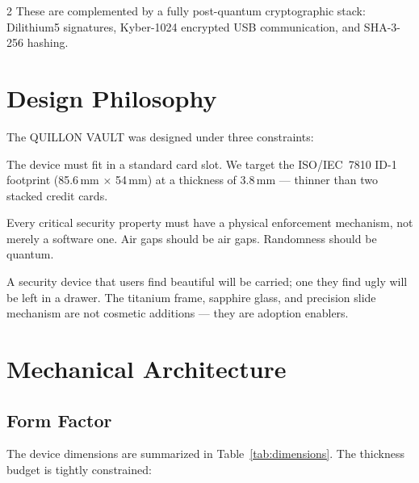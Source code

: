 \documentclass[11pt,a4paper]{article}
\begin{document}
\begin{multicols}{2}
These are complemented by a fully post-quantum cryptographic stack: Dilithium5
signatures, Kyber-1024 encrypted USB communication, and SHA-3-256 hashing.

\section{Design Philosophy}

The QUILLON VAULT was designed under three constraints:

\begin{description}[leftmargin=0.5em,itemsep=2pt]
  \item[Thinness.] The device must fit in a standard card slot. We target the
    ISO/IEC~7810 ID-1 footprint (85.6\,mm $\times$ 54\,mm) at a thickness of
    3.8\,mm --- thinner than two stacked credit cards.

  \item[Security by physics.] Every critical security property must have a
    physical enforcement mechanism, not merely a software one. Air gaps
    should be air gaps. Randomness should be quantum.

  \item[Elegance.] A security device that users find beautiful will be
    carried; one they find ugly will be left in a drawer. The titanium
    frame, sapphire glass, and precision slide mechanism are not cosmetic
    additions --- they are adoption enablers.
\end{description}

\section{Mechanical Architecture}

\subsection{Form Factor}

The device dimensions are summarized in Table~\ref{tab:dimensions}.
The thickness budget is tightly constrained:


\end{multicols}
\end{document}
